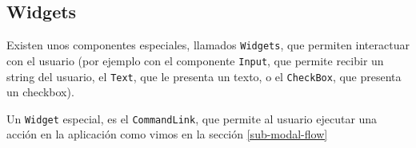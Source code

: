 



\subsection{Widgets}
\label{sub-widget}

Existen unos componentes especiales, llamados \verb"Widgets"\cite{WDGTS}, que permiten interactuar con el usuario (por ejemplo con el componente \verb"Input", que permite recibir un string del usuario, el \verb"Text", que le presenta un texto, o el \verb"CheckBox", que presenta un checkbox).

Un \verb"Widget" especial, es el \verb"CommandLink", que permite al usuario ejecutar una acción en la aplicación como vimos en la sección \ref{sub-modal-flow}

